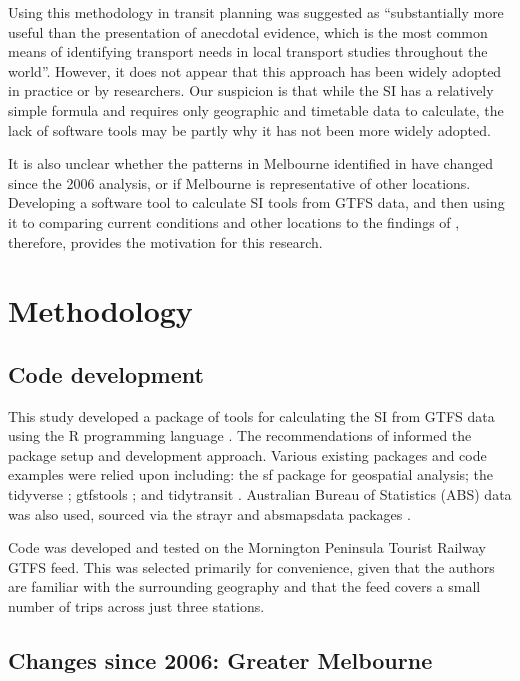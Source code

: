 \documentclass[preprint, 3p,
authoryear]{elsarticle} %
\begin{document}
Using this methodology in transit planning was suggested as
``substantially more useful than the presentation of anecdotal evidence,
which is the most common means of identifying transport needs in local
transport studies throughout the world''\citep{currie2010identifying}.
However, it does not appear that this approach has been widely adopted
in practice or by researchers. Our suspicion is that while the SI has a
relatively simple formula and requires only geographic and timetable
data to calculate, the lack of software tools may be partly why it has
not been more widely adopted.

It is also unclear whether the patterns in Melbourne identified in
\citet{currie2010identifying} have changed since the 2006 analysis, or
if Melbourne is representative of other locations. Developing a software
tool to calculate SI tools from GTFS data, and then using it to
comparing current conditions and other locations to the findings of
\citet{currie2010identifying}, therefore, provides the motivation for
this research.

\hypertarget{methodology}{%
\section{Methodology}\label{methodology}}

\hypertarget{code-development}{%
\subsection{Code development}\label{code-development}}

This study developed a package of tools for calculating the SI from GTFS
data using the R programming language \citep{R-base}. The
recommendations of \citet{wickham2023r} informed the package setup and
development approach. Various existing packages and code examples were
relied upon including: the sf package \citep{R-sf} for geospatial
analysis; the tidyverse \citep{tidyverse2019}; gtfstools
\citep{R-gtfstools}; and tidytransit \citep{R-tidytransit}. Australian
Bureau of Statistics (ABS) data was also used, sourced via the strayr
and absmapsdata packages \citep{r-strayr}.

Code was developed and tested on the Mornington Peninsula Tourist
Railway GTFS feed. This was selected primarily for convenience, given
that the authors are familiar with the surrounding geography and that
the feed covers a small number of trips across just three stations.

\hypertarget{changes-since-2006-greater-melbourne}{%
\subsection{Changes since 2006: Greater
Melbourne}\label{changes-since-2006-greater-melbourne}}
\end{document}
